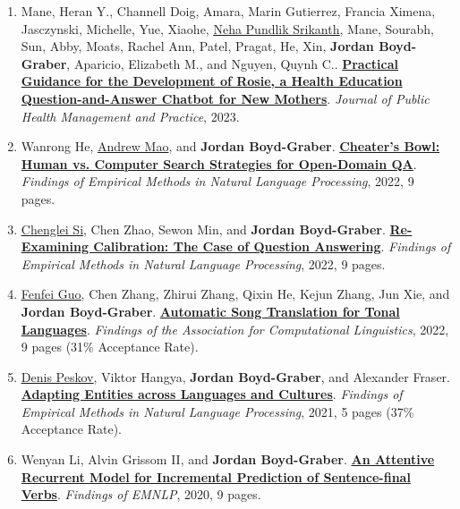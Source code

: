 {\begin{enumerate}
	 \item Mane, Heran Y., Channell Doig, Amara, Marin Gutierrez, Francia Ximena, Jasczynski, Michelle, Yue, Xiaohe, \underline{\href{https://nehasrikn.github.io/}{Neha Pundlik Srikanth}}, Mane, Sourabh, Sun, Abby, Moats, Rachel Ann, Patel, Pragat, He, Xin, {\bf Jordan Boyd-Graber}, Aparicio, Elizabeth M., and Nguyen, Quynh C..  {\bf \href{https://journals.lww.com/jphmp/fulltext/2023/09000/practical_guidance_for_the_development_of_rosie,_a.9.aspx}{Practical Guidance for the Development of Rosie, a Health Education Question-and-Answer Chatbot for New Mothers}}.  \emph{Journal of Public Health Management and Practice}, 2023.

	 \item Wanrong He, \underline{Andrew Mao}, and {\bf Jordan Boyd-Graber}.  {\bf \href{http://cs.umd.edu/~jbg//docs/2022_emnlp_cheaters.pdf}{Cheater's Bowl: Human vs. Computer Search Strategies for Open-Domain QA}}.  \emph{Findings of Empirical Methods in Natural Language Processing}, 2022, 9 pages.

	 \item \underline{\href{https://noviscl.github.io}{Chenglei Si}}, Chen Zhao, Sewon Min, and {\bf Jordan Boyd-Graber}.  {\bf \href{http://cs.umd.edu/~jbg//docs/2022_emnlp_calibration.pdf}{Re-Examining Calibration: The Case of Question Answering}}.  \emph{Findings of Empirical Methods in Natural Language Processing}, 2022, 9 pages.

	 \item \underline{\href{https://www.linkedin.com/in/fenfei-guo-74924031}{Fenfei Guo}}, Chen Zhang, Zhirui Zhang, Qixin He, Kejun Zhang, Jun Xie, and {\bf Jordan Boyd-Graber}.  {\bf \href{http://cs.umd.edu/~jbg//docs/2022_acl_ast.pdf}{Automatic Song Translation for Tonal Languages}}.  \emph{Findings of the Association for Computational Linguistics}, 2022, 9 pages (31\% Acceptance Rate).

	 \item \underline{\href{https://denis.ai/}{Denis Peskov}}, Viktor Hangya, {\bf Jordan Boyd-Graber}, and Alexander Fraser.  {\bf \href{http://cs.umd.edu/~jbg//docs/2021_emnlp_adaptation.pdf}{Adapting Entities across Languages and Cultures}}.  \emph{Findings of Empirical Methods in Natural Language Processing}, 2021, 5 pages (37\% Acceptance Rate).

	 \item Wenyan Li, Alvin {Grissom II}, and {\bf Jordan Boyd-Graber}.  {\bf \href{http://cs.umd.edu/~jbg//docs/2020_findings_verbs.pdf}{An Attentive Recurrent Model for Incremental Prediction of Sentence-final Verbs}}.  \emph{Findings of EMNLP}, 2020, 9 pages.


\end{enumerate}}
